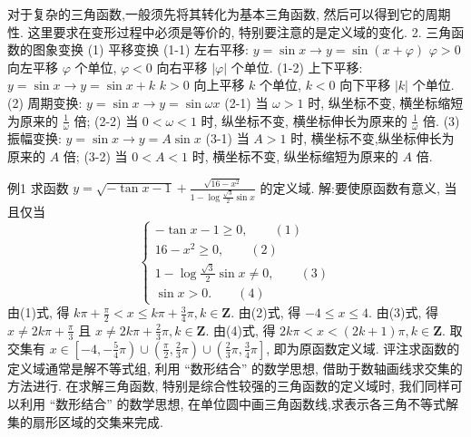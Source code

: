 对于复杂的三角函数,一般须先将其转化为基本三角函数, 然后可以得到它的周期性.
这里要求在变形过程中必须是等价的, 特别要注意的是定义域的变化.
2. 三角函数的图象变换
(1) 平移变换
(1-1) 左右平移: $y=\sin x \rightarrow y=\sin (x+\varphi)$
$\varphi>0$ 向左平移 $\varphi$ 个单位, $\varphi<0$ 向右平移 $|\varphi|$ 个单位.
(1-2) 上下平移: $y=\sin x \rightarrow y=\sin x+k$
$k>0$ 向上平移 $k$ 个单位, $k<0$ 向下平移 $|k|$ 个单位.
(2) 周期变换: $y=\sin x \rightarrow y=\sin \omega x$
(2-1) 当 $\omega>1$ 时, 纵坐标不变, 横坐标缩短为原来的 $\frac{1}{\omega}$ 倍;
(2-2) 当 $0<\omega<1$ 时, 纵坐标不变, 横坐标伸长为原来的 $\frac{1}{\omega}$ 倍.
(3) 振幅变换: $y=\sin x \rightarrow y=A \sin x$
(3-1) 当 $A>1$ 时, 横坐标不变,纵坐标伸长为原来的 $A$ 倍;
(3-2) 当 $0<A<1$ 时, 横坐标不变, 纵坐标缩短为原来的 $A$ 倍.



例1 求函数 $y=\sqrt{-\tan x-1}+\frac{\sqrt{16-x^2}}{1-\log \frac{\sqrt{3}}{2} \sin x}$ 的定义域.
解:要使原函数有意义, 当且仅当
$$
\left\{\begin{array}{l}
-\tan x-1 \geqslant 0, \quad\quad (1)\\
16-x^2 \geqslant 0, \quad\quad (2)\\
1-\log \frac{\sqrt{3}}{2} \sin x \neq 0,\quad\quad (3) \\
\sin x>0 .\quad\quad (4)
\end{array}\right.
$$
由(1)式, 得 $k \pi+\frac{\pi}{2}<x \leqslant k \pi+\frac{3}{4} \pi, k \in \mathbf{Z}$.
由(2)式, 得 $-4 \leqslant x \leqslant 4$.
由(3)式, 得 $x \neq 2 k \pi+\frac{\pi}{3}$ 且 $x \neq 2 k \pi+\frac{2}{3} \pi, k \in \mathbf{Z}$.
由(4)式, 得 $2 k \pi<x<(2 k+1) \pi, k \in \mathbf{Z}$.
取交集有 $x \in\left[-4,-\frac{5}{4} \pi\right) \cup\left(\frac{\pi}{2}, \frac{2}{3} \pi\right) \cup\left(\frac{2}{3} \pi, \frac{3}{4} \pi\right]$, 即为原函数定义域.
评注求函数的定义域通常是解不等式组, 利用 “数形结合” 的数学思想, 借助于数轴画线求交集的方法进行.
在求解三角函数, 特别是综合性较强的三角函数的定义域时, 我们同样可以利用 “数形结合” 的数学思想, 在单位圆中画三角函数线,求表示各三角不等式解集的扇形区域的交集来完成.



